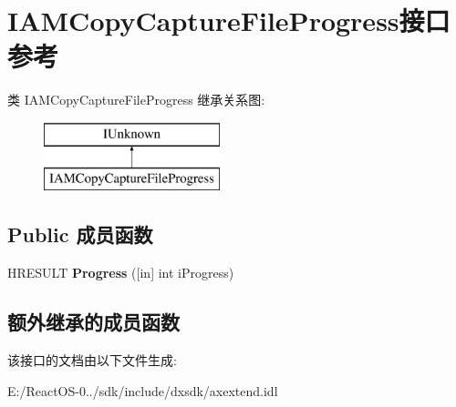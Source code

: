 \hypertarget{interface_i_a_m_copy_capture_file_progress}{}\section{I\+A\+M\+Copy\+Capture\+File\+Progress接口 参考}
\label{interface_i_a_m_copy_capture_file_progress}
类 I\+A\+M\+Copy\+Capture\+File\+Progress 继承关系图\+:\begin{figure}[H]
\begin{center}
\leavevmode
\includegraphics[height=2.000000cm]{interface_i_a_m_copy_capture_file_progress}
\end{center}
\end{figure}
\subsection*{Public 成员函数}
\begin{DoxyCompactItemize}
\item 
\mbox{\label{interface_i_a_m_copy_capture_file_progress_a231bc58ee270edb1c5d1b92da7cffd35}} 
H\+R\+E\+S\+U\+LT {\bfseries Progress} (\mbox{[}in\mbox{]} int i\+Progress)
\end{DoxyCompactItemize}
\subsection*{额外继承的成员函数}


该接口的文档由以下文件生成\+:\begin{DoxyCompactItemize}
\item 
E\+:/\+React\+O\+S-\/0../sdk/include/dxsdk/axextend.\+idl\end{DoxyCompactItemize}
